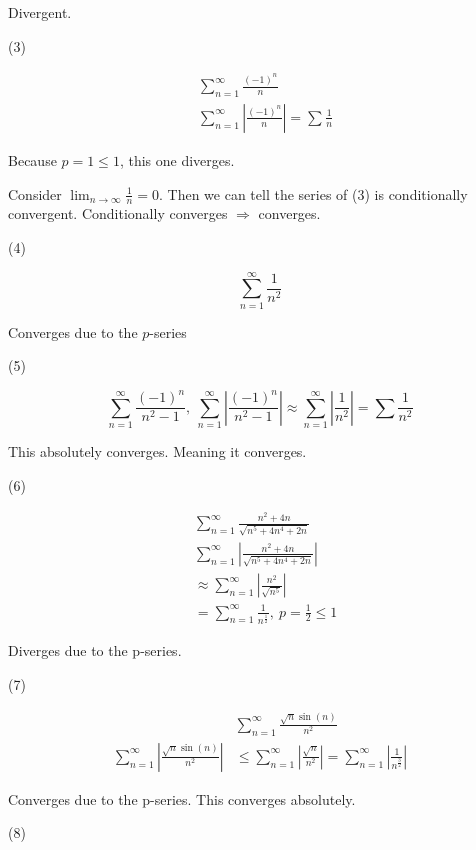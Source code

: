 \documentclass[12pt]{article}
\theoremstyle{plain}
\theoremstyle{remark}
\theoremstyle{definition}
\begin{document}
Divergent.

(3)

\begin{align*}
&\sum_{n = 1}^{\infty}\frac{( - 1)^{n}}{n} \\
&\sum_{n = 1}^{\infty}\left| \frac{( - 1)^{n}}{n} \right| = \sum_{}^{}\frac{1}{n}
\end{align*}


Because \(p = 1 \leq 1\), this one diverges.

Consider \(\lim_{n \rightarrow \infty}\frac{1}{n} = 0\). Then we can
tell the series of (3) is conditionally convergent. Conditionally
converges \(\Rightarrow\) converges.

(4)

\[\sum_{n = 1}^{\infty}\frac{1}{n^{2}}\]

Converges due to the \(p\)-series

(5)

\[\sum_{n = 1}^{\infty}\frac{( - 1)^{n}}{n^{2} - 1},\ \sum_{n = 1}^{\infty}\left| \frac{( - 1)^{n}}{n^{2} - 1} \right| \approx \sum_{n = 1}^{\infty}\left| \frac{1}{n^{2}} \right| = \sum_{}^{}\frac{1}{n^{2}}\]

This absolutely converges. Meaning it converges.

(6)

\begin{align*}
&\sum_{n = 1}^{\infty}\frac{n^{2} + 4n}{\sqrt{n^{5} + 4n^{4} + 2n}} \\
&\sum_{n = 1}^{\infty}\left| \frac{n^{2} + 4n}{\sqrt{n^{5} + 4n^{4} + 2n}} \right|  \\
&\approx \sum_{n = 1}^{\infty}\left| \frac{n^{2}}{\sqrt{n^{5}}} \right|  \\
&= \sum_{n = 1}^{\infty}\frac{1}{n^{\frac{1}{2}}},\ p = \frac{1}{2} \leq 1
\end{align*}


Diverges due to the p-series.

(7)

\begin{align*}
&\sum_{n = 1}^{\infty}\frac{\sqrt{n}\sin(n)}{n^{2}} \\
\sum_{n = 1}^{\infty}\left| \frac{\sqrt{n}\sin(n)}{n^{2}} \right| &\leq \sum_{n = 1}^{\infty}\left| \frac{\sqrt{n}}{n^{2}} \right| = \sum_{n = 1}^{\infty}\left| \frac{1}{n^{\frac{3}{2}}} \right|
\end{align*}


Converges due to the p-series. This converges absolutely.

(8)
\end{document}
